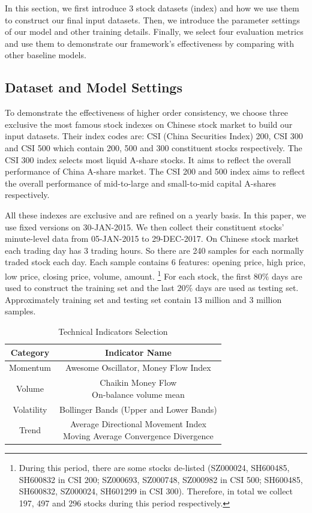 \documentclass[sigconf,anonymous,review]{acmart}
\begin{document}
In this section, we first introduce 3 stock datasets (index) and
how we use them to construct our final input datasets. Then, we
introduce the parameter settings of our model and other training
details. Finally, we select four evaluation metrics and use them
to demonstrate our framework's effectiveness by comparing with
other baseline models.

\subsection{Dataset and Model Settings}
\label{sec:dataset}

To demonstrate the effectiveness of higher order consistency, we
choose three exclusive the most famous stock indexes on Chinese
stock market to build our input datasets. Their index codes are:
CSI (China Securities Index) 200, CSI 300 and CSI 500 which
contain 200, 500 and 300 constituent stocks respectively. The CSI
300 index selects most liquid A-share stocks. It aims to reflect
the overall performance of China A-share market. The CSI 200 and
500 index aims to reflect the overall performance of mid-to-large
and small-to-mid capital A-shares respectively.

All these indexes are exclusive and are refined on a yearly
basis. In this paper, we use fixed versions on 30-JAN-2015. We
then collect their constituent stocks' minute-level data from
05-JAN-2015 to 29-DEC-2017. On Chinese stock market each trading
day has 3 trading hours. So there are 240 samples for each
normally traded stock each day. Each sample contains 6 features:
opening price, high price, low price, closing price, volume,
amount. \footnote{During this period, there are some stocks
  de-listed (SZ000024, SH600485, SH600832 in CSI 200; SZ000693,
  SZ000748, SZ000982 in CSI 500; SH600485, SH600832, SZ000024,
  SH601299 in CSI 300). Therefore, in total we collect 197, 497
  and 296 stocks during this period respectively.} For each
stock, the first $80\%$ days are used to construct the training
set and the last $20\%$ days are used as testing set.
Approximately training set and testing set contain 13 million and
3 million samples.

\begin{table}[H]
\centering
\caption{Technical Indicators Selection}
\begin{tabular}{|c|c|} \hline
  Category&Indicator Name\\ \hline
  Momentum& Awesome Oscillator, Money Flow Index\\ \hline
  Volume& \makecell{Chaikin Money Flow\\ On-balance volume mean}\\ \hline
  Volatility& Bollinger Bands (Upper and Lower Bands)\\ \hline
  Trend& \makecell{Average Directional Movement Index\\Moving Average Convergence Divergence}\\ \hline
\end{tabular}
  \label{tab:ta}
\end{table}
\end{document}
